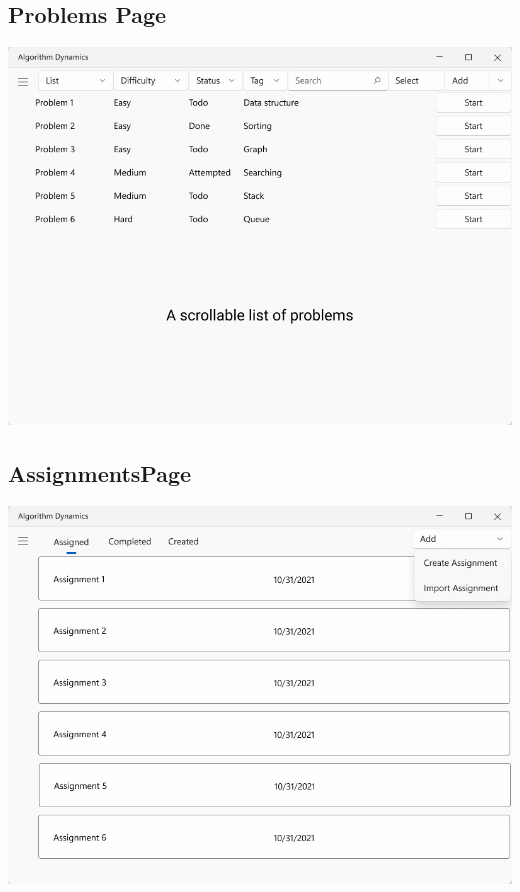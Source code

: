 \documentclass[a4paper]{report}
\begin{document}
\subsection{Problems Page}

\includegraphics[width=\textwidth, height=\textheight, keepaspectratio]{ProblemsPage-Design}

\subsection{AssignmentsPage}

\includegraphics[width=\textwidth, height=\textheight, keepaspectratio]{AssignmentsPage-Design}
\end{document}
